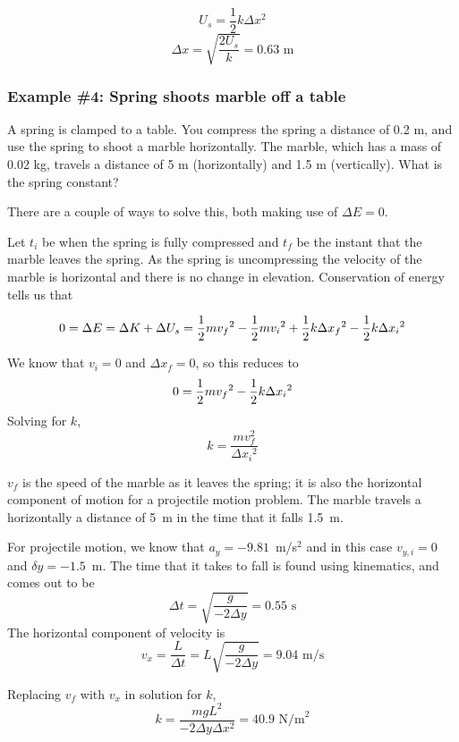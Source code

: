 $$U_s=\frac{1}{2}k\Delta{x}^2$$
$$\Delta{x}=\sqrt{\frac{2U_s}{k}}=0.63\mbox{ m}$$

\subsubsection*{Example \#4: Spring shoots marble off a table}
A spring is clamped to a table. You compress the spring a distance of 0.2 m, and use the spring to shoot a marble horizontally. The marble, which has a mass of 0.02 kg, travels a distance of 5 m (horizontally) and 1.5 m (vertically). What is the spring constant?

There are a couple of ways to solve this, both making use of $\Delta{E}=0$.

Let $t_i$ be when the spring is fully compressed and $t_f$ be the instant that the marble leaves the spring. As the spring is uncompressing the velocity of the marble is horizontal and there is no change in elevation. Conservation of energy tells us that

$$0=\Delta{E}=\Delta{K}+\Delta{U_s}=\frac{1}{2}mv_f\displaystyle^2-\frac{1}{2}mv_i\displaystyle^2+\frac{1}{2}k\Delta{x_f}^2-\frac{1}{2}k\Delta{x_i}\displaystyle^2$$

We know that $v_i=0$ and $\Delta x_f=0$, so this reduces to
$$0=\frac{1}{2}mv_f\displaystyle^2-\frac{1}{2}k\Delta{x_i}\displaystyle^2$$
Solving for $k$,
$$k=\frac{mv_f^2}{\Delta{x_i}^2}$$

$v_f$ is the speed of the marble as it leaves the spring; it is also the horizontal component of motion for a projectile motion problem. The marble travels a horizontally a distance of 5~m in the time that it falls 1.5~m.

For projectile motion, we know that $a_y=-9.81$~m/s$^2$ and in this case $v_{y,i}=0$ and $\delta y=-1.5$~m. The time that it takes to fall is found using kinematics, and comes out to be
$$\Delta t = \sqrt{\frac{g}{-2\Delta y}} = 0.55\mbox{ s}$$
The horizontal component of velocity is
$$v_x = \frac{L}{\Delta t} = L\sqrt{\frac{g}{-2\Delta y}} = 9.04\mbox{ m/s}$$

Replacing $v_f$ with $v_x$ in solution for $k$,
$$k=\frac{mgL^2}{-2\Delta{y}\Delta{x}^2}=\boxed{40.9\mbox{ N/m}^2}$$


\clearpage

